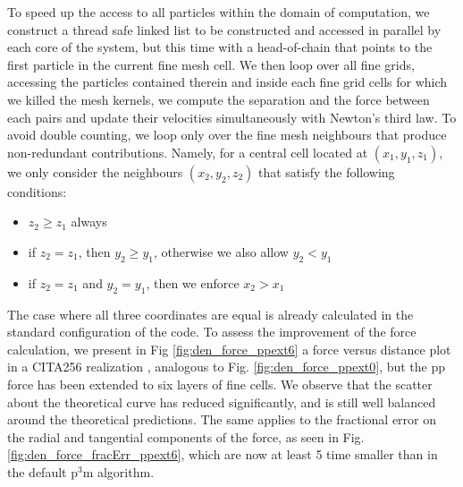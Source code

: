  To speed up the access to all particles within the domain of computation, we construct a thread safe linked list
 to be constructed and accessed in parallel by each core of the system, but this time with a head-of-chain that points to the first particle in the current fine mesh cell. We then loop over all fine grids, accessing the particles contained therein and inside each fine grid cells for which we killed the mesh kernels,
 we compute the separation and the force between each pairs and update their velocities simultaneously with Newton's third law. 
 To avoid double counting, we loop only over the fine mesh neighbours that produce non-redundant contributions. Namely, for a central cell located at 
 $(x_1, y_1, z_1)$, we only consider the neighbours $(x_2, y_2, z_2)$ that satisfy the following conditions:
 \begin{itemize}
 \item{$z_2 \ge z_1$ always}
 \item{if $z_2 = z_1$, then $y_2 \ge y_1$, otherwise we also allow $y_2 < y_1$} 
 \item{if $z_2 = z_1$ and $y_2 = y_1$, then we enforce $x_2 > x_1$}
 \end{itemize}
 The case where all three coordinates are equal is already calculated in the standard configuration of the code.
 To assess the improvement of the force calculation, we present in Fig \ref{fig:den_force_ppext6} a force versus distance
 plot in a CITA256 realization , analogous to Fig. \ref{fig:den_force_ppext0}, but the pp force has been extended to six layers of fine cells. 
 We observe that the scatter about the theoretical curve has reduced significantly, and is still well balanced around the theoretical predictions.
 The same applies to the fractional error on the radial and tangential components of the force, as seen in Fig. \ref{fig:den_force_fracErr_ppext6},
 which are now at least 5 time smaller than in the default p$^{3}$m algorithm.
 
